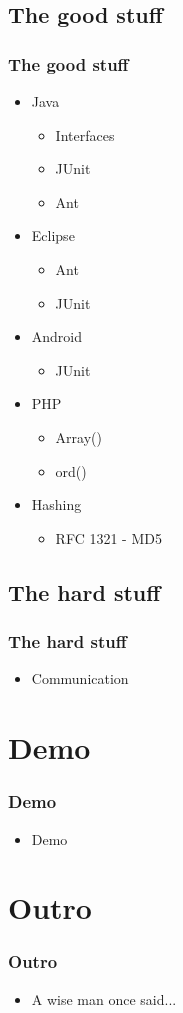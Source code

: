 \documentclass{beamer}
\begin{document}
\subsection{The good stuff}
\frame
{
    \frametitle{The good stuff}

    \begin{itemize}
        \item Java
            \begin{itemize}
                \item Interfaces
                \item JUnit
                \item Ant
            \end{itemize}
        \item Eclipse
            \begin{itemize}
                \item Ant
                \item JUnit
            \end{itemize}
        \item Android
            \begin{itemize}
                \item JUnit
            \end{itemize}
        \item PHP
            \begin{itemize}
                \item Array()
                \item ord()
            \end{itemize}
        \item Hashing
            \begin{itemize}
                \item RFC 1321 - MD5
            \end{itemize}
    \end{itemize}
}

\subsection{The hard stuff}
\frame
{
    \frametitle{The hard stuff}

    \begin{itemize}
        \item Communication
    \end{itemize}
}

\section{Demo}
\frame
{
    \frametitle{Demo}

    \begin{itemize}
        \item Demo
    \end{itemize}
}
\section{Outro}
\frame
{
    \frametitle{Outro}

    \begin{itemize}
        \item A wise man once said...
    \end{itemize}
}
\end{document}
